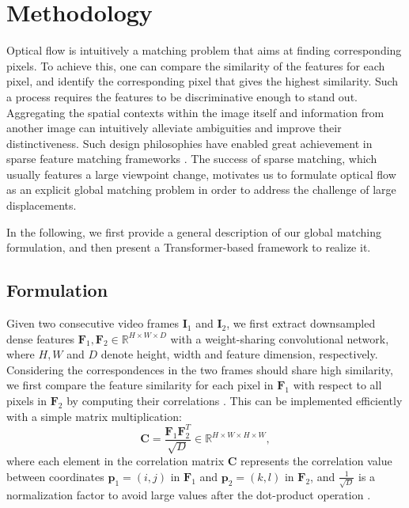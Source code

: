 \documentclass[10pt,twocolumn,letterpaper]{article}
\begin{document}
\section{Methodology}
Optical flow is intuitively a matching problem that aims at finding corresponding pixels. To achieve this, one can compare the similarity of the features for each pixel, and identify the corresponding pixel that gives the highest similarity. Such a process requires the features to be discriminative enough to stand out. Aggregating the spatial contexts within the image itself and information from another image can intuitively alleviate ambiguities and improve their distinctiveness. Such design philosophies have enabled great achievement in sparse feature matching frameworks \cite{sarlin2020superglue,sun2021loftr}. The success of sparse matching, which usually features a large viewpoint change, motivates us to formulate optical flow as an explicit global matching problem in order to address the challenge of large displacements.

In the following, we first provide a general description of our global matching formulation, and then present a Transformer-based framework to realize it.


\subsection{Formulation}
\label{sec:formulation}
Given two consecutive video frames ${\bm I}_1$ and ${\bm I}_2$, we first extract downsampled dense features ${\bm F}_1, {\bm F}_2 \in \mathbb{R}^{H \times W \times D}$ with a weight-sharing convolutional network, where $H, W$ and $D$ denote height, width and feature dimension, respectively. Considering the correspondences in the two frames should share high similarity, we first compare the feature similarity for each pixel in ${\bm F}_1$ with respect to all pixels in ${\bm F}_2$ by computing their correlations \cite{wang2020learning}. This can be implemented efficiently with a simple matrix multiplication:
\begin{equation}
\label{eq:corr}
    {\bm C} =  \frac{{\bm F}_1 {\bm F}_2^T}{\sqrt{D}}  \in \mathbb{R}^{H \times W \times H \times W}, 
\end{equation}
where each element in the correlation matrix ${\bm C}$ represents the correlation value between coordinates ${\bm p}_1 = (i, j)$ in ${\bm F}_1$ and ${\bm p}_2 = (k, l)$ in ${\bm F}_2$, and $\frac{1}{\sqrt{D}}$ is a normalization factor to avoid large values after the dot-product operation \cite{vaswani2017attention}.
\end{document}
